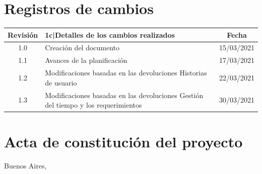 \documentclass[11pt]{charter}
\begin{document}
\maketitle
\thispagestyle{empty}
\pagebreak


\thispagestyle{empty}
{\setlength{\parskip}{0pt}
\tableofcontents{}
}
\pagebreak


\section{Registros de cambios}
\label{sec:registro}


\begin{table}[ht]
\label{tab:registro}
\centering
\begin{tabularx}{\linewidth}{@{}|c|X|c|@{}}
\hline
\rowcolor[HTML]{C0C0C0} 
Revisión & {1}{c|}{\cellcolor[HTML]{C0C0C0}Detalles de los cambios realizados} & Fecha      \\ \hline
1.0      & Creación del documento                                          & 15/03/2021 \\ \hline
1.1      & Avances de la planificación & 17/03/2021 \\ \hline
1.2      & Modificaciones basadas en las devoluciones \newline
		   Historias de usuario											   & 22/03/2021 \\ \hline
1.3      & Modificaciones basadas en las devoluciones \newline
		   Gestión del tiempo y los requerimientos								   & 30/03/2021 \\ \hline
\end{tabularx}
\end{table}

\pagebreak



\section{Acta de constitución del proyecto}
\label{sec:acta}

\begin{flushright}
Buenos Aires, \fechaInicioName
\end{flushright}

\vspace{2cm}
\end{document}
